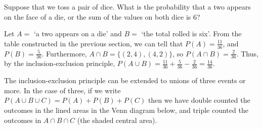 \par
\begin{example}
Suppose that we toss a pair of dice. What is the probability that a two appears on the face of a die, or the sum of the values on both dice is 6?
\par
\noindent Let $A =$ `a two appears on a die' and $B =$ `the total rolled is six'. From the table constructed in the previous section, we can tell that $P(A) = \frac{11}{36}$, and $P(B) = \frac{5}{36}$. Furthermore, $A \cap B = \{(2,4),(4,2)\}$, so $P(A \cap B) = \frac{2}{36}$. Thus, by the inclusion-exclusion principle, $P(A \cup B) = \frac{11}{36} + \frac{5}{36} - \frac{2}{36} = \frac{14}{36}$.
\end{example}
\par
The inclusion-exclusion principle can be extended to unions of three events or more. In the case of three, if we write $P(A \cup B \cup C) = P(A) +  P(B) + P(C)$ then we have double counted the outcomes in the lined areas in the Venn diagram below, and triple counted the outcomes in $A \cap B \cap C$ (the shaded central area).
\begin{center}
\end{center}
